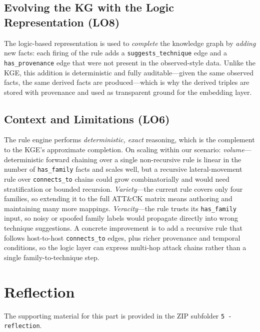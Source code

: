 \documentclass{article}
\begin{document}
\subsection{Evolving the KG with the Logic Representation (LO8)}
\label{sec:logic-evolution}
The logic-based representation is used to \emph{complete} the knowledge graph
by \emph{adding} new facts: each firing of the rule adds a
\texttt{suggests\_technique} edge and a \texttt{has\_provenance} edge that
were not present in the observed-style data. Unlike the KGE, this addition is
deterministic and fully auditable---given the same observed facts, the same
derived facts are produced---which is why the derived triples are stored with
provenance and used as transparent ground for the embedding layer.

\subsection{Context and Limitations (LO6)}
\label{sec:logic-context}
The rule engine performs \emph{deterministic, exact} reasoning, which is the
complement to the KGE's approximate completion. On scaling within our
scenario: \emph{volume}---deterministic forward chaining over a single
non-recursive rule is linear in the number of \texttt{has\_family} facts and
scales well, but a recursive lateral-movement rule over \texttt{connects\_to}
chains could grow combinatorially and would need stratification or bounded
recursion. \emph{Variety}---the current rule covers only four families, so
extending it to the full ATT\&CK matrix means authoring and maintaining many
more mappings. \emph{Veracity}---the rule trusts its \texttt{has\_family}
input, so noisy or spoofed family labels would propagate directly into wrong
technique suggestions. A concrete improvement is to add a recursive rule that
follows host-to-host \texttt{connects\_to} edges, plus richer provenance and
temporal conditions, so the logic layer can express multi-hop attack chains
rather than a single family-to-technique step.

\section{Reflection}
\label{sec:reflection}
The supporting material for this part is provided in the ZIP subfolder
\texttt{5 - reflection}.
\end{document}
